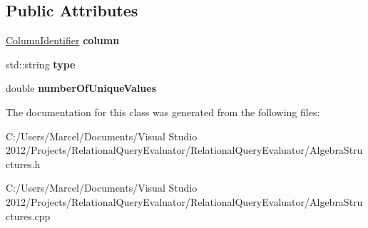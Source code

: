\subsection*{Public Attributes}
\begin{DoxyCompactItemize}
\item 
\hypertarget{class_column_info_a13c87a82665272f3eb3e18a8323d0d7e}{\hyperlink{class_column_identifier}{Column\+Identifier} {\bfseries column}}\label{class_column_info_a13c87a82665272f3eb3e18a8323d0d7e}

\item 
\hypertarget{class_column_info_add303d9d4415fc18b790d9a904831c29}{std\+::string {\bfseries type}}\label{class_column_info_add303d9d4415fc18b790d9a904831c29}

\item 
\hypertarget{class_column_info_add402bfa7bed26aa6072c5da9b06dda9}{double {\bfseries number\+Of\+Unique\+Values}}\label{class_column_info_add402bfa7bed26aa6072c5da9b06dda9}

\end{DoxyCompactItemize}


The documentation for this class was generated from the following files\+:\begin{DoxyCompactItemize}
\item 
C\+:/\+Users/\+Marcel/\+Documents/\+Visual Studio 2012/\+Projects/\+Relational\+Query\+Evaluator/\+Relational\+Query\+Evaluator/Algebra\+Structures.\+h\item 
C\+:/\+Users/\+Marcel/\+Documents/\+Visual Studio 2012/\+Projects/\+Relational\+Query\+Evaluator/\+Relational\+Query\+Evaluator/Algebra\+Structures.\+cpp\end{DoxyCompactItemize}
